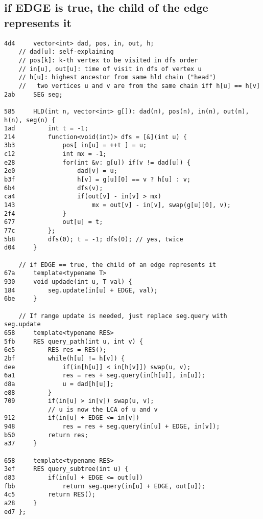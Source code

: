 \documentclass[11pt, a4paper, twoside]{article}
\begin{document}
\subsection{if EDGE is true, the child of the edge represents it}
\begin{lstlisting}
4d4 	vector<int> dad, pos, in, out, h;
	// dad[u]: self-explaining
	// pos[k]: k-th vertex to be visited in dfs order
	// in[u], out[u]: time of visit in dfs of vertex u
	// h[u]: highest ancestor from same hld chain ("head")
	// 	 two vertices u and v are from the same chain iff h[u] == h[v]
2ab 	SEG seg;

585 	HLD(int n, vector<int> g[]): dad(n), pos(n), in(n), out(n), h(n), seg(n) {
1ad 		int t = -1;
214 		function<void(int)> dfs = [&](int u) {
3b3 			pos[ in[u] = ++t ] = u;
c12 			int mx = -1;
e28 			for(int &v: g[u]) if(v != dad[u]) {
2e0 				dad[v] = u;
b3f 				h[v] = g[u][0] == v ? h[u] : v;
6b4 				dfs(v);
ca4 				if(out[v] - in[v] > mx) 
143 					mx = out[v] - in[v], swap(g[u][0], v);
2f4 			}
677 			out[u] = t;
77c 		};
5b8 		dfs(0); t = -1; dfs(0); // yes, twice 
d04 	}

	// if EDGE == true, the child of an edge represents it
67a 	template<typename T>
930 	void updade(int u, T val) {
184 		seg.update(in[u] + EDGE, val);
6be 	}

	// If range update is needed, just replace seg.query with seg.update
658 	template<typename RES> 
5fb 	RES query_path(int u, int v) {
6e5 		RES res = RES();
2bf 		while(h[u] != h[v]) {
dee 			if(in[h[u]] < in[h[v]]) swap(u, v);
6a1 			res = res + seg.query(in[h[u]], in[u]);
d8a 			u = dad[h[u]];
e88 		}
709 		if(in[u] > in[v]) swap(u, v);
    		// u is now the LCA of u and v
912 		if(in[u] + EDGE <= in[v]) 
948 			res = res + seg.query(in[u] + EDGE, in[v]);
b50 		return res;
a37 	}

658 	template<typename RES> 
3ef 	RES query_subtree(int u) {
d83 		if(in[u] + EDGE <= out[u])
fbb 			return seg.query(in[u] + EDGE, out[u]);
4c5 		return RES();
a28 	}
ed7 };
\end{lstlisting}
\end{document}
